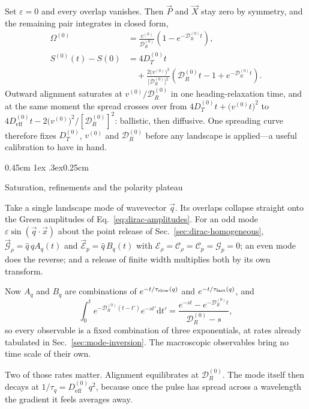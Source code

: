 \documentclass[
  reprint,
  superscriptaddress,
  amsmath,
  amssymb,
  aps,
  pre,
  nofootinbib,
  floatfix
]{revtex4-2}
\makeatletter
\newcommand{\dd}{\mathrm d}
\newcommand{\DR}{\mathcal D_R^{(0)}}
\newcommand{\Pnet}{\vec P}
\newcommand{\Xc}{\vec X}
\newcommand{\Erho}{\mathcal E_\rho}
\newcommand{\Crho}{\mathcal C_\rho}
\newcommand{\Gp}{\mathcal G_p}
\newcommand{\Cp}{\mathcal C_p}
\newcommand{\Gv}{\vec{\mathcal G}_\rho}
\newcommand{\Piv}{\vec{\mathcal E}_p}
\def\subsection{\@startsection{subsection}{2}{\z@}%
  {0.45cm \@plus1ex \@minus.3ex}{0.25cm}%
  {\normalfont\small\bfseries\raggedright}}%
\makeatother
\begin{document}
Set $\varepsilon=0$ and every overlap vanishes.  Then $\Pnet$ and $\Xc$ stay
zero by symmetry, and the remaining pair integrates in closed form,
\begin{equation}
\begin{aligned}
 \Omega^{(0)}&=\frac{v^{(0)}}{\DR}\left(1-e^{-\DR t}\right),\\
 S^{(0)}(t)-S(0)&=4D_T^{(0)}t\\
 &\quad+\frac{2\bigl(v^{(0)}\bigr)^{2}}{\bigl[\DR\bigr]^{2}}
 \left(\DR t-1+e^{-\DR t}\right).
\end{aligned}
 \label{eq:baseline-observables}
\end{equation}
Outward alignment saturates at $v^{(0)}/\DR$ in one heading-relaxation time,
and at the same moment the spread crosses over from
$4D_T^{(0)}t+\bigl(v^{(0)}t\bigr)^2$ to
$4D_{\mathrm{eff}}^{(0)}t-2\bigl(v^{(0)}\bigr)^2/[\DR]^2$: ballistic, then
diffusive.  One spreading curve therefore fixes $D_T^{(0)}$, $v^{(0)}$ and
$\DR$ before any landscape is applied---a useful calibration to have in hand.

\subsection{Saturation, refinements and the polarity plateau}

Take a single landscape mode of wavevector $\vec q$.  Its overlaps collapse
straight onto the Green amplitudes of Eq.~\eqref{eq:dirac-amplitudes}.  For an
odd mode $\varepsilon\sin(\vec q\cdot\vec x)$ about the point release of
Sec.~\ref{sec:dirac-homogeneous}, $\Gv=\hat q\,qA_q(t)$ and
$\Piv=\hat q\,B_q(t)$ with $\Erho=\Crho=\Cp=\Gp=0$; an even mode does the reverse; and a
release of finite width multiplies both by its own transform.

Now $A_q$ and $B_q$ are combinations of $e^{-t/\tau_{\rm slow}(q)}$ and
$e^{-t/\tau_{\rm fast}(q)}$, and
\begin{equation}
 \int_0^te^{-\DR(t-t')}e^{-st'}\dd t'
 =\frac{e^{-st}-e^{-\DR t}}{\DR-s},
 \label{eq:observable-convolution}
\end{equation}
so every observable is a fixed combination of three exponentials, at rates
already tabulated in Sec.~\ref{sec:mode-inversion}.  The macroscopic
observables bring no time scale of their own.

Two of those rates matter.  Alignment equilibrates at $\DR$.  The mode itself
then decays at $1/\tau_q=D_{\mathrm{eff}}^{(0)}q^{2}$, because once the pulse
has spread across a wavelength the gradient it feels averages away.
\end{document}
